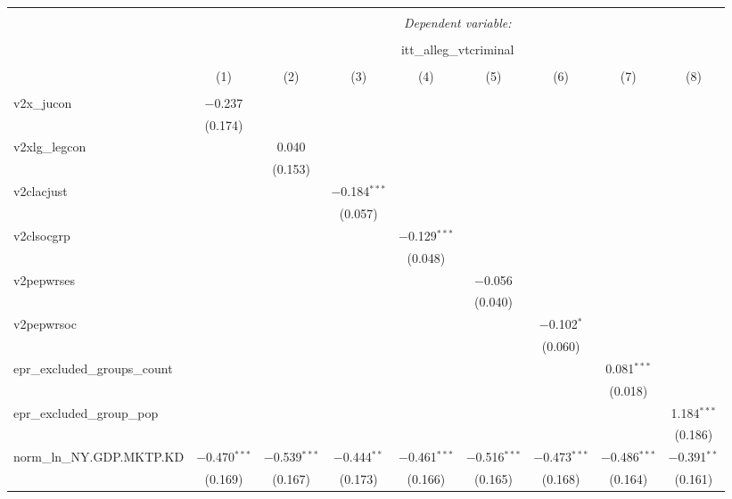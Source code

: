 
\begin{sidewaystable}[!htbp] \centering 
  \caption{} 
  \label{} 
\tiny 
\begin{tabular}{@{\extracolsep{5pt}}lcccccccc} 
\\[-1.8ex]\hline 
\hline \\[-1.8ex] 
 & \multicolumn{8}{c}{\textit{Dependent variable:}} \\ 
\cline{2-9} 
\\[-1.8ex] & \multicolumn{8}{c}{itt\_alleg\_vtcriminal} \\ 
\\[-1.8ex] & (1) & (2) & (3) & (4) & (5) & (6) & (7) & (8)\\ 
\hline \\[-1.8ex] 
 v2x\_jucon & $-$0.237 &  &  &  &  &  &  &  \\ 
  & (0.174) &  &  &  &  &  &  &  \\ 
  v2xlg\_legcon &  & 0.040 &  &  &  &  &  &  \\ 
  &  & (0.153) &  &  &  &  &  &  \\ 
  v2clacjust &  &  & $-$0.184$^{***}$ &  &  &  &  &  \\ 
  &  &  & (0.057) &  &  &  &  &  \\ 
  v2clsocgrp &  &  &  & $-$0.129$^{***}$ &  &  &  &  \\ 
  &  &  &  & (0.048) &  &  &  &  \\ 
  v2pepwrses &  &  &  &  & $-$0.056 &  &  &  \\ 
  &  &  &  &  & (0.040) &  &  &  \\ 
  v2pepwrsoc &  &  &  &  &  & $-$0.102$^{*}$ &  &  \\ 
  &  &  &  &  &  & (0.060) &  &  \\ 
  epr\_excluded\_groups\_count &  &  &  &  &  &  & 0.081$^{***}$ &  \\ 
  &  &  &  &  &  &  & (0.018) &  \\ 
  epr\_excluded\_group\_pop &  &  &  &  &  &  &  & 1.184$^{***}$ \\ 
  &  &  &  &  &  &  &  & (0.186) \\ 
  norm\_ln\_NY.GDP.MKTP.KD & $-$0.470$^{***}$ & $-$0.539$^{***}$ & $-$0.444$^{**}$ & $-$0.461$^{***}$ & $-$0.516$^{***}$ & $-$0.473$^{***}$ & $-$0.486$^{***}$ & $-$0.391$^{**}$ \\ 
  & (0.169) & (0.167) & (0.173) & (0.166) & (0.165) & (0.168) & (0.164) & (0.161) \\ 

\end{tabular}
\end{sidewaystable}
